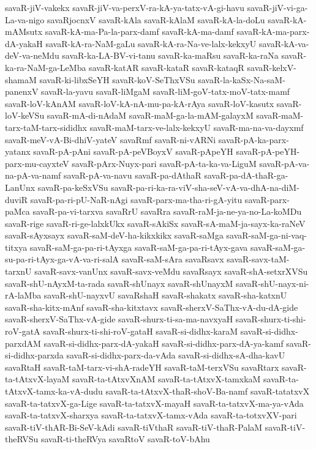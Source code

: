 {savaR-jiV-vakekx
savaR-jiV-va-perxV-ra-kA-ya-tatx-vA-gi-havu
savaR-jiV-vi-ga-La-va-nigo
savaRjocnxV
savaR-kAla
savaR-kAlaM
savaR-kA-la-doLu
savaR-kA-mAMsutx
savaR-kA-ma-Pa-la-parx-damf
savaR-kA-ma-damf
savaR-kA-ma-parx-dA-yakaH
savaR-kA-ra-NaM-gaLu
savaR-kA-ra-Na-ve-lalx-kekxyU
savaR-kA-va-deV-va-neMdu
savaR-ka-LA-BV-vi-tanu
savaR-ka-maRsu
savaR-ka-raNa
savaR-ka-ra-NaM-ga-LeMba
savaR-katAR
savaR-kataR
savaR-kataqR
savaR-kelxV-shamaM
savaR-ki-libxSeYH
savaR-koV-SeThxVSu
savaR-la-kaSx-Na-saM-panenxV
savaR-la-yavu
savaR-liMgaM
savaR-liM-goV-tatx-moV-tatx-mamf
savaR-loV-kAnAM
savaR-loV-kA-nA-mu-pa-kA-rAya
savaR-loV-kasutx
savaR-loV-keVSu
savaR-mA-di-nAdaM
savaR-maM-ga-la-mAM-galayxM
savaR-maM-tarx-taM-tarx-sididhx
savaR-maM-tarx-ve-lalx-kekxyU
savaR-ma-na-va-dayxmf
savaR-meV-vA-Bi-dhiV-yateV
savaRmf
savaR-ni-vARNi
savaR-pA-ka-parx-yatanx
savaR-pA-pAni
savaR-pA-peVBoyxV
savaR-pApeYH
savaR-pA-peYH-parx-mu-cayxteV
savaR-pArx-Nuyx-pari
savaR-pA-ta-ka-va-LiguM
savaR-pA-va-na-pA-va-namf
savaR-pA-va-navu
savaR-pa-dAthaR
savaR-pa-dA-thaR-ga-LanUnx
savaR-pa-keSxVSu
savaR-pa-ri-ka-ra-viV-sha-seV-vA-va-dhA-na-diM-duviR
savaR-pa-ri-pU-NaR-nAgi
savaR-parx-ma-tha-ri-gA-yitu
savaR-parx-paMca
savaR-pa-vi-tarxva
savaRrU
savaRra
savaR-raM-ja-ne-ya-no-La-koMDu
savaR-rige
savaR-ri-ge-lalxkUkx
savaR-sAkiSx
savaR-sA-maM-ja-sayx-ka-raNeV
savaR-sAyxsayx
savaR-saM-deV-ha-kikxkikx
savaR-saMga
savaR-saM-ga-ni-vaq-titxya
savaR-saM-ga-pa-ri-tAyxga
savaR-saM-ga-pa-ri-tAyx-gava
savaR-saM-ga-su-pa-ri-tAyx-ga-vA-va-ri-salA
savaR-saM-sAra
savaRsavx
savaR-savx-taM-tarxnU
savaR-savx-vanUnx
savaR-savx-veMdu
savaRsayx
savaR-shA-setxrXVSu
savaR-shU-nAyxM-ta-rada
savaR-shUnayx
savaR-shUnayxM
savaR-shU-nayx-ni-rA-laMba
savaR-shU-nayxvU
savaRshaH
savaR-shakatx
savaR-sha-katxnU
savaR-sha-kitx-mAnf
savaR-sha-kitxtavx
savaR-sherxV-SaThx-vA-du-dA-gide
savaR-sherxV-SaThx-vA-gide
savaR-shurx-ti-sa-ma-navxyaH
savaR-shurx-ti-shi-roV-gatA
savaR-shurx-ti-shi-roV-gataH
savaR-si-didhx-karaM
savaR-si-didhx-parxdAM
savaR-si-didhx-parx-dA-yakaH
savaR-si-didhx-parx-dA-ya-kamf
savaR-si-didhx-parxda
savaR-si-didhx-parx-da-vAda
savaR-si-didhx-sA-dha-kavU
savaRtaH
savaR-taM-tarx-vi-shA-radeYH
savaR-taM-terxVSu
savaRtarx
savaR-ta-tAtxvX-layaM
savaR-ta-tAtxvXnAM
savaR-ta-tAtxvX-tamxkaM
savaR-ta-tAtxvX-tamx-ka-vA-dudu
savaR-ta-tAtxvX-thaR-shoV-Ba-namf
savaR-tatatxvX
savaR-ta-tatxvX-ga-Lige
savaR-ta-tatxvX-mayaH
savaR-ta-tatxvX-ma-ya-vAda
savaR-ta-tatxvX-sharxya
savaR-ta-tatxvX-tamx-vAda
savaR-ta-totxvXV-pari
savaR-tiV-thAR-Bi-SeV-kAdi
savaR-tiVthaR
savaR-tiV-thaR-PalaM
savaR-tiV-theRVSu
savaR-ti-theRVya
savaRtoV
savaR-toV-bAhu
}

